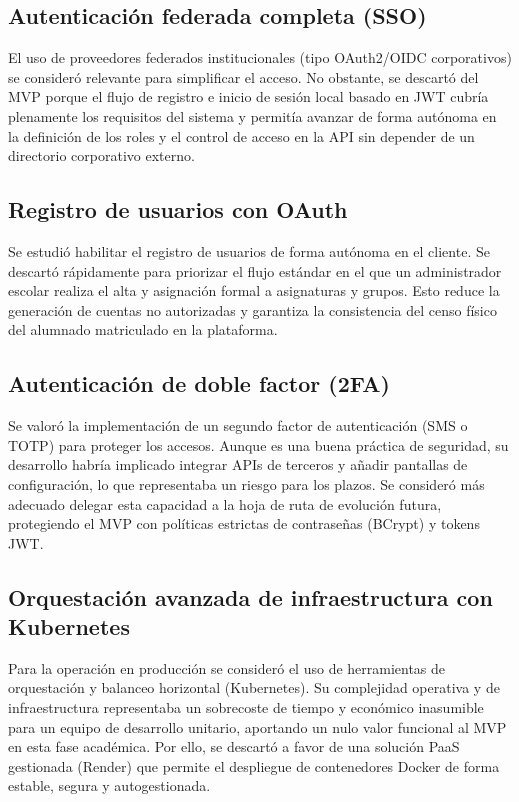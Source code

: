 \subsection{Autenticaci\'on federada completa (SSO)}
El uso de proveedores federados institucionales (tipo OAuth2/OIDC corporativos) se consider\'o relevante para simplificar el acceso. No obstante, se descart\'o del MVP porque el flujo de registro e inicio de sesi\'on local basado en JWT cubr\'ia plenamente los requisitos del sistema y permit\'ia avanzar de forma aut\'onoma en la definici\'on de los roles y el control de acceso en la API sin depender de un directorio corporativo externo.

\subsection{Registro de usuarios con OAuth}
Se estudi\'o habilitar el registro de usuarios de forma aut\'onoma en el cliente. Se descart\'o r\'apidamente para priorizar el flujo est\'andar en el que un administrador escolar realiza el alta y asignaci\'on formal a asignaturas y grupos. Esto reduce la generaci\'on de cuentas no autorizadas y garantiza la consistencia del censo f\'isico del alumnado matriculado en la plataforma.

\subsection{Autenticaci\'on de doble factor (2FA)}
Se valor\'o la implementaci\'on de un segundo factor de autenticaci\'on (SMS o TOTP) para proteger los accesos. Aunque es una buena pr\'actica de seguridad, su desarrollo habr\'ia implicado integrar APIs de terceros y a\~nadir pantallas de configuraci\'on, lo que representaba un riesgo para los plazos. Se consider\'o m\'as adecuado delegar esta capacidad a la hoja de ruta de evoluci\'on futura, protegiendo el MVP con pol\'iticas estrictas de contrase\~nas (BCrypt) y tokens JWT.

\subsection{Orquestaci\'on avanzada de infraestructura con Kubernetes}
Para la operaci\'on en producci\'on se consider\'o el uso de herramientas de orquestaci\'on y balanceo horizontal (Kubernetes). Su complejidad operativa y de infraestructura representaba un sobrecoste de tiempo y econ\'omico inasumible para un equipo de desarrollo unitario, aportando un nulo valor funcional al MVP en esta fase acad\'emica. Por ello, se descart\'o a favor de una soluci\'on PaaS gestionada (Render) que permite el despliegue de contenedores Docker de forma estable, segura y autogestionada.

